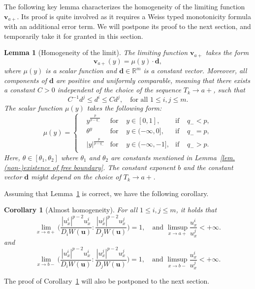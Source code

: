 \documentclass[11pt,twoside,reqno]{amsart}
\newtheorem{lemma}{Lemma}[section]
\newtheorem{corollary}{Corollary}[section]
\numberwithin{equation}{section}
\begin{document}
The following key lemma characterizes the homogeneity of the limiting function
$\mathbf{v}_{a+}$. Its proof is quite involved as it requires a Weiss typed monotonicity formula with an additional error term. We will postpone its proof to the next section, and temporarily take it for granted in this section.
\begin{lemma}[Homogeneity of the limit]\label{lem. homogeneity of the limit}
    The limiting function $\mathbf{v}_{a+}$ takes the form
    \begin{equation*}
        \mathbf{v}_{a+}(y)=\mu(y)\cdot\mathbf{d},
    \end{equation*}
    where $\mu(y)$ is a scalar function and $\mathbf{d}\in\mathbb{R}^{m}$ is a constant vector. Moreover, all components of $\mathbf{d}$ are positive and uniformly comparable, meaning that there exists a constant $C>0$ independent of the choice of the sequence $T_{k}\to a+$, such that
    \begin{equation}\label{eq. d's components are uniformly comparable}
        C^{-1} d^{j}\leq d^{i}\leq C d^{j},\quad\mbox{for all }1\leq i,j\leq m.
    \end{equation}
    The scalar function $\mu(y)$ takes the following form:
    \begin{equation}\label{formmu}
        \mu(y)=\left\{\begin{aligned}
            &y^{\frac{p}{p-q_{-}}}&\mbox{for }&y\in[0,1],&\mbox{if }&q_{-}<p,\\
            &\theta^{y}&\mbox{for }&y\in(-\infty,0],&\mbox{if }&q_{-}=p,\\
            &|y|^{\frac{p}{p-q_{-}}}&\mbox{for }&y\in(-\infty,-1],&\mbox{if }&q_{-}>p.\\
        \end{aligned}\right.
    \end{equation}
    Here, $\theta\in[\theta_{1},\theta_{2}]$ where $\theta_{1}$ and $\theta_{2}$ are constants mentioned in Lemma~\ref{lem. (non-)existence of free boundary}. The constant exponent $b$ and the constant vector $\mathbf{d}$ might depend on the choice of $T_{k}\to a+$.
\end{lemma}

Assuming that Lemma~\ref{lem. homogeneity of the limit} is correct, we have the following corollary.
\begin{corollary}[Almost homogeneity]\label{cor3.1}
    For all $1\leq i,j\leq m$, it holds that
    \begin{equation*}
        \lim_{x\to a+}\Big(\frac{|u_{x}^{i}|^{p-2}u_{x}^{i}}{D_{i}W(\mathbf{u})}:\frac{|u_{x}^{j}|^{p-2}u_{x}^{j}}{D_{j}W(\mathbf{u})}\Big)=1,\quad\mbox{and }\limsup_{x\to a+}\frac{u^{i}_{x}}{u^{j}_{x}}<+\infty.
    \end{equation*}
    and 
     \begin{equation*}
        \lim_{x\to b-}\Big(\frac{|u_{x}^{i}|^{p-2}u_{x}^{i}}{D_{i}W(\mathbf{u})}:\frac{|u_{x}^{j}|^{p-2}u_{x}^{j}}{D_{j}W(\mathbf{u})}\Big)=1,\quad\mbox{and }\limsup_{x\to b-}\frac{u^{i}_{x}}{u^{j}_{x}}<+\infty.
    \end{equation*}
\end{corollary}
The proof of Corollary~\ref{cor3.1} will also be postponed to the next section.
\end{document}
